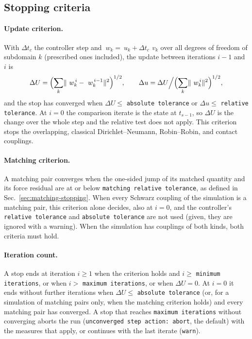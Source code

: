 \documentclass[11pt]{article}
\newcommand{\norm}[1]{\lVert #1 \rVert}
\newcommand{\code}[1]{\texttt{#1}}
\begin{document}
\subsection{Stopping criteria}
\label{sec:stopping}

\paragraph{Update criterion.} With $\Delta t_c$ the controller step and
$~w_k = ~u_k + \Delta t_c\, ~v_k$ over all degrees of freedom of subdomain
$k$ (prescribed ones included), the update between iterations $i-1$ and
$i$ is
\begin{equation}
  \Delta U = \Bigl( \sum_k \norm{~w_k^{\,i} - ~w_k^{\,i-1}}^2 \Bigr)^{1/2},
  \qquad
  \Delta u = \Delta U \Big/ \Bigl( \sum_k \norm{~w_k^{\,i}}^2 \Bigr)^{1/2},
  \label{eq:update}
\end{equation}
and the stop has converged when $\Delta U \le$ \code{absolute tolerance}
or $\Delta u \le$ \code{relative tolerance}. At $i = 0$ the comparison
iterate is the state at $t_{s-1}$, so $\Delta U$ is the change over the
whole step and the relative test does not apply. This criterion stops the
overlapping, classical Dirichlet--Neumann, Robin--Robin, and contact
couplings.

\paragraph{Matching criterion.} A matching pair converges when the
one-sided jump of its matched quantity and its force residual are at or
below \code{matching relative tolerance}, as defined in
Sec.~\ref{sec:matching-stopping}. When every Schwarz coupling of the
simulation is a matching pair, this criterion alone decides, also at
$i = 0$, and the controller's \code{relative tolerance} and
\code{absolute tolerance} are not used (given, they are ignored with a
warning). When the simulation has couplings
of both kinds, both criteria must hold.

\paragraph{Iteration count.} A stop ends at iteration $i \ge 1$ when the
criterion holds and $i \ge$ \code{minimum iterations}, or when
$i >$ \code{maximum iterations}, or when $\Delta U = 0$. At $i = 0$ it
ends without further iterations when $\Delta U \le$
\code{absolute tolerance} (or, for a simulation of matching pairs only,
when the matching criterion holds) and every matching pair has converged.
A stop that reaches \code{maximum iterations} without converging aborts
the run (\code{unconverged step action: abort}, the default) with the
measures that apply, or continues with the last iterate
(\code{warn}).
\end{document}
